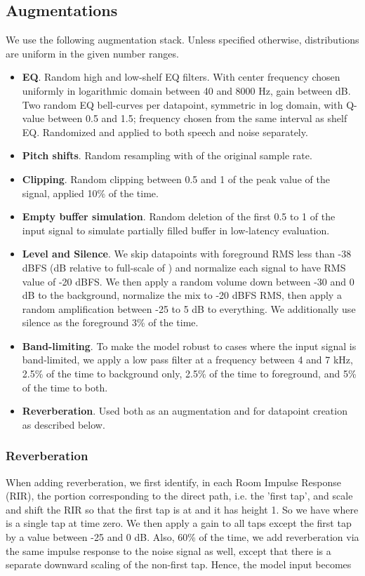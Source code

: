 \documentclass[english]{article}
\begin{document}
\subsection{Augmentations}

We use the following augmentation stack. Unless specified otherwise, distributions are uniform in the given number ranges. 
\begin{itemize}
    \item {\bf EQ}. Random high and low-shelf EQ filters. With center frequency chosen uniformly in logarithmic domain between 40 and 8000 Hz, gain between  dB. Two random EQ bell-curves per datapoint, symmetric in log domain, with Q-value between 0.5 and 1.5; frequency chosen from the same interval as shelf EQ. Randomized and applied to both speech and noise separately. 
    \item {\bf Pitch shifts}. Random resampling with  of the original sample rate.
    \item {\bf Clipping}. Random clipping between 0.5 and 1 of the peak value of the signal, applied 10\% of the time. 
    \item {\bf Empty buffer simulation}. Random deletion of the first 0.5 to 1 of the input signal to simulate partially filled buffer in low-latency evaluation. 
    \item {\bf Level and Silence}. We skip datapoints with foreground RMS less than -38 dBFS (dB relative to full-scale of ) and normalize each signal to have RMS value of -20 dBFS. We then apply a random volume down between -30 and 0 dB to the background, normalize the mix to -20 dBFS RMS, then apply a random amplification between -25 to 5 dB to everything. We additionally use silence as the foreground 3\% of the time.
    \item {\bf Band-limiting}. To make the model robust to cases where the input signal is band-limited, we apply a low pass filter at a frequency between 4 and 7 kHz, 2.5\% of the time to background only, 2.5\% of the time to foreground, and 5\% of the time to both. 
    \item {\bf Reverberation}. Used both as an augmentation and for datapoint creation as described below.  
\end{itemize}

\subsubsection{Reverberation} 

When adding reverberation, we first identify, in each  Room Impulse Response (RIR), the portion corresponding to the direct path, i.e. the 'first tap', and scale and shift the RIR so that the first tap is at  and it has height 1. So we have  where  is a single tap at time zero. We then apply a gain to all taps except the first tap by a value between -25 and 0 dB. Also, 60\% of the time, we add reverberation via the same impulse response to the noise signal as well, except that there is a separate downward scaling of the non-first tap. Hence, the model input becomes
\end{document}
